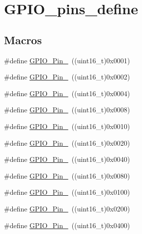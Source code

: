 \hypertarget{group___g_p_i_o__pins__define}{}\section{G\+P\+I\+O\+\_\+pins\+\_\+define}
\label{group___g_p_i_o__pins__define}
\subsection*{Macros}
\begin{DoxyCompactItemize}
\item 
\#define \mbox{\hyperlink{group___g_p_i_o__pins__define_gab305b8d1be9f89bf2b4a05589b456049}{G\+P\+I\+O\+\_\+\+Pin\+\_}}~((uint16\+\_\+t)0x0001)
\item 
\#define \mbox{\hyperlink{group___g_p_i_o__pins__define_ga29db642c26f1fa0fffc3ecadcd30f82b}{G\+P\+I\+O\+\_\+\+Pin\+\_}}~((uint16\+\_\+t)0x0002)
\item 
\#define \mbox{\hyperlink{group___g_p_i_o__pins__define_gabdf6630324b2f99360537a310687187c}{G\+P\+I\+O\+\_\+\+Pin\+\_}}~((uint16\+\_\+t)0x0004)
\item 
\#define \mbox{\hyperlink{group___g_p_i_o__pins__define_ga763c6544859dbe28cd3f8ad820045556}{G\+P\+I\+O\+\_\+\+Pin\+\_}}~((uint16\+\_\+t)0x0008)
\item 
\#define \mbox{\hyperlink{group___g_p_i_o__pins__define_gacbf04d09b954606cdcc55eb2e81780e3}{G\+P\+I\+O\+\_\+\+Pin\+\_}}~((uint16\+\_\+t)0x0010)
\item 
\#define \mbox{\hyperlink{group___g_p_i_o__pins__define_ga32dbe930f52ce5ab60190c65e9dc741e}{G\+P\+I\+O\+\_\+\+Pin\+\_}}~((uint16\+\_\+t)0x0020)
\item 
\#define \mbox{\hyperlink{group___g_p_i_o__pins__define_gaf047899d873f27c2db9f50b342e35a58}{G\+P\+I\+O\+\_\+\+Pin\+\_}}~((uint16\+\_\+t)0x0040)
\item 
\#define \mbox{\hyperlink{group___g_p_i_o__pins__define_ga7346b6ce5507bd28a7a79e7dcc816c08}{G\+P\+I\+O\+\_\+\+Pin\+\_}}~((uint16\+\_\+t)0x0080)
\item 
\#define \mbox{\hyperlink{group___g_p_i_o__pins__define_gac891f0984dc64af3567577fbf13ab304}{G\+P\+I\+O\+\_\+\+Pin\+\_}}~((uint16\+\_\+t)0x0100)
\item 
\#define \mbox{\hyperlink{group___g_p_i_o__pins__define_gaad1891082d5d6bcac06c2729a9fdd2f0}{G\+P\+I\+O\+\_\+\+Pin\+\_}}~((uint16\+\_\+t)0x0200)
\item 
\#define \mbox{\hyperlink{group___g_p_i_o__pins__define_ga726af6407ba60ac60f02057227c2d348}{G\+P\+I\+O\+\_\+\+Pin\+\_}}~((uint16\+\_\+t)0x0400)

\end{DoxyCompactItemize}
